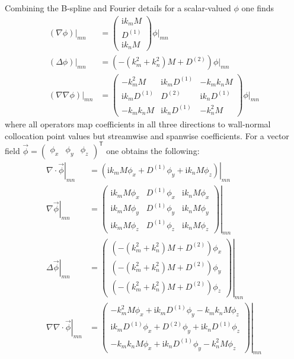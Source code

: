 \documentclass[letterpaper,11pt,nointlimits,reqno,draft]{amsart}
\newcommand{\ii}{\ensuremath{\mathrm{i}}}
\newcommand{\trans}[1]{{#1}^{\ensuremath{\mathsf{T}}}}
\begin{document}
Combining the B-spline and Fourier details for a scalar-valued $\phi$ one finds
\begin{align}
  \left.\left(\nabla{} \phi\right)\right|_{m n}
&=
  \begin{pmatrix}
    \ii k_m M \\
    D^{(1)}   \\
    \ii k_n M
  \end{pmatrix} \phi\bigr|_{m n}
\\
   \left.\left(\Delta{} \phi\right)\right|_{m n}
&= \left( -\left(k_m^2 + k_n^2\right)M + D^{(2)} \right) \phi\bigr|_{m n}
\\
  \left.\left(\nabla\nabla{} \phi\right)\right|_{m n}
&=
  \begin{pmatrix}
    -k_m^2      M       & \ii k_m D^{(1)} & -k_{m}k_{n} M   \\
    \ii k_m     D^{(1)} &         D^{(2)} & \ii k_n D^{(1)} \\
    -k_{m}k_{n} M       & \ii k_n D^{(1)} & -k_n^2 M
  \end{pmatrix} \phi\bigr|_{m n}
\end{align}
where all operators map coefficients in all three directions to wall-normal
collocation point values but streamwise and spanwise coefficients.  For a
vector field $\vec{\phi}=\trans{\begin{pmatrix}\phi_{x} & \phi_{y} &
 \phi_{z}\end{pmatrix}}$ one obtains the following:
\begin{align}
  \left.\nabla\cdot\vec{\phi}\right|_{m n}
&=
  \left.\left(\ii k_m M \phi_{x} + D^{(1)} \phi_{y} + \ii k_n M \phi_{z}\right)\right|_{m n}
\\
  \left.\nabla\vec{\phi}\right|_{m n}
&=
  \left.\begin{pmatrix}
    \ii k_m M \phi_{x} & D^{(1)} \phi_{x} & \ii k_n M \phi_{x} \\
    \ii k_m M \phi_{y} & D^{(1)} \phi_{y} & \ii k_n M \phi_{y} \\
    \ii k_m M \phi_{z} & D^{(1)} \phi_{z} & \ii k_n M \phi_{z}
  \end{pmatrix}\right|_{m n}
\\
  \left.\Delta\vec{\phi}\right|_{m n}
&=
  \left.\begin{pmatrix}
    \left( -\left(k_m^2 + k_n^2\right)M + D^{(2)} \right) \phi_{x} \\
    \left( -\left(k_m^2 + k_n^2\right)M + D^{(2)} \right) \phi_{y} \\
    \left( -\left(k_m^2 + k_n^2\right)M + D^{(2)} \right) \phi_{z}
  \end{pmatrix}\right|_{m n}
\\
  \left.\nabla\nabla\cdot\vec{\phi}\right|_{m n}
&=
  \left.\begin{pmatrix}
    - k_m^2 M \phi_{x}       + \ii k_m D^{(1)} \phi_{y} - k_{m}k_{n} M \phi_{z} \\
    \ii k_m D^{(1)} \phi_{x} + D^{(2)} \phi_{y} + \ii k_n D^{(1)} \phi_{z}      \\
    - k_{m}k_{n} M \phi_{x} + \ii k_n D^{(1)} \phi_{y} - k_n^2 M \phi_{z}
  \end{pmatrix}\right|_{m n}
\end{align}
\end{document}
